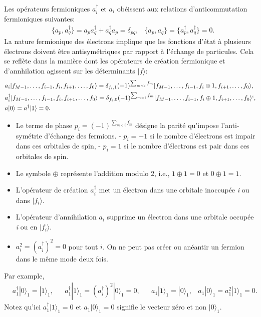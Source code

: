 Les opérateurs fermioniques $a^\dagger_i$ et $a_i$ obéissent aux
relations d'anticommutation fermioniques suivantes: 
\begin{align}
&\{a_p,a^\dagger_q\} = a_pa^\dagger_q + a^\dagger_q a_p = \delta_{pq}, 
&\{a_p, a_q \} = \{a^\dagger_p, a^\dagger_q\} = 0 .
\end{align} 
La nature fermionique des électrons implique que les
fonctions d'état à plusieurs électrons doivent être antisymétriques par
rapport à l'échange de particules. Cela se reflète dans la manière dont
les opérateurs de création fermionique et d'annhilation agissent sur les
déterminants $|f\rangle$: 
\begin{equation}
\begin{aligned}
&a_i|f_{M-1},\dots,f_{i-1},f_i,f_{i+1},\dots, f_0\rangle = \delta_{f_i,1}
(-1)^{\sum_{m<i}f_m}|f_{M-1},\dots,f_{i-1},f_i\oplus 1,f_{i+1},\dots, f_0\rangle,\\
&a^\dagger_i|f_{M-1},\dots,f_{i-1},f_i,f_{i+1},\dots, f_0\rangle = \delta_{f_i,0}
(-1)^{\sum_{m<i}f_m}|f_{M-1},\dots,f_{i-1},f_i\oplus 1,f_{i+1},\dots, f_0\rangle`,  \\
&a|0\rangle=a^\dagger|1\rangle=0.
\end{aligned}
\end{equation} 
\begin{itemize}
\item Le terme de phase $p_i=(-1)^{\sum_{m<i}f_m}$ désigne
la parité qu'impose l'anti-symétrie d'échange des fermions. - $p_i=-1$
si le nombre d'électrons est impair dans ces orbitales de spin, -
$p_i= 1$ si le nombre d'électrons est pair dans ces orbitales de spin.
\item Le symbole $\oplus$ représente l'addition modulo 2, i.e., $1
  \oplus 1=0 $ et $0 \oplus 1=1$.
\item L'opérateur de création $a^\dagger_i$ met un électron dans une
  orbitale inoccupée \emph{i} ou dans $|f_i\rangle$.
\item L'opérateur d'annihilation $a_i$ supprime un électron dans une
  orbitale occupée \emph{i} ou en $|f_i\rangle$.
\item $a_i^2 =(a^\dagger_i)^2= 0$ pour tout $i$. On ne peut pas créer ou
  anéantir un fermion dans le même mode deux fois.
\end{itemize}

Par example, 
\begin{align} 
&a^\dagger_1 |0\rangle_1 = |1\rangle_1,&&a^\dagger_1 |1\rangle_1 =(a^\dagger_i)^2|0\rangle_1= 0,&& a_1 |1\rangle_1 =|0\rangle_1,&a_1 |0\rangle_1 =a_1^2|1\rangle_1=0. 
\end{align} 
Notez qu'ici $a^\dagger_1|1\rangle_1=0$ et $a_1 |0\rangle_1=0$ signifie le vecteur zéro et non $|0\rangle_1$.

